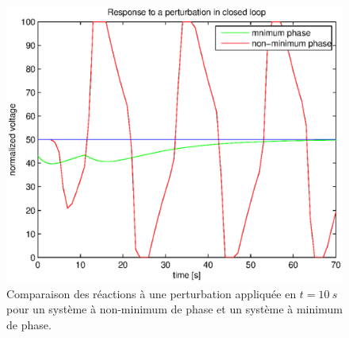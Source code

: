 \documentclass[frenchb, paper=a4, fontsize=11pt]{scrartcl}
\numberwithin{equation}{section}					%
\numberwithin{figure}{section}					%
\numberwithin{table}{section}						%
\begin{document}
\begin{figure}[ht]
	\centering
	\includegraphics[scale=0.9]{img/pert-rejection-closed-loop.eps}
	\caption{Comparaison des réactions à une perturbation appliquée en
	$t=\SI{10}{s}$ pour un système à non-minimum de phase et un système
	à minimum de phase.}
	\label{fig:settling-time}
\end{figure}
\end{document}
